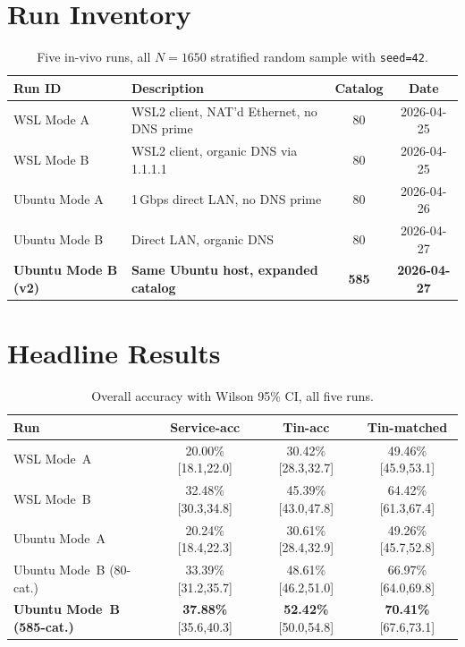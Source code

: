 \documentclass[11pt,a4paper]{article}
\begin{document}
\section{Run Inventory}

\begin{table}[h]
\centering
\caption{Five in-vivo runs, all $N=1650$ stratified random sample with
\texttt{seed=42}.}
\begin{tabularx}{\textwidth}{lXcc}
\toprule
\textbf{Run ID} & \textbf{Description} & \textbf{Catalog} & \textbf{Date} \\
\midrule
WSL Mode A     & WSL2 client, NAT'd Ethernet, no DNS prime           & 80    & 2026-04-25 \\
WSL Mode B     & WSL2 client, organic DNS via 1.1.1.1                & 80    & 2026-04-25 \\
Ubuntu Mode A  & 1\,Gbps direct LAN, no DNS prime                    & 80    & 2026-04-26 \\
Ubuntu Mode B  & Direct LAN, organic DNS                             & 80    & 2026-04-27 \\
\textbf{Ubuntu Mode B (v2)} & \textbf{Same Ubuntu host, expanded catalog}    & \textbf{585}   & \textbf{2026-04-27} \\
\bottomrule
\end{tabularx}
\end{table}

\section{Headline Results}

\begin{table}[h]
\centering
\caption{Overall accuracy with Wilson 95\% CI, all five runs.}
\label{tab:overall}
\begin{tabular}{l|ccc}
\toprule
\textbf{Run} & \textbf{Service-acc} & \textbf{Tin-acc} & \textbf{Tin-matched} \\
\midrule
WSL    Mode~A           & 20.00\% [18.1,22.0] & 30.42\% [28.3,32.7] & 49.46\% [45.9,53.1] \\
WSL    Mode~B           & 32.48\% [30.3,34.8] & 45.39\% [43.0,47.8] & 64.42\% [61.3,67.4] \\
Ubuntu Mode~A           & 20.24\% [18.4,22.3] & 30.61\% [28.4,32.9] & 49.26\% [45.7,52.8] \\
Ubuntu Mode~B (80-cat.) & 33.39\% [31.2,35.7] & 48.61\% [46.2,51.0] & 66.97\% [64.0,69.8] \\
\rowcolor{blue!8} \textbf{Ubuntu Mode~B (585-cat.)} & \textbf{37.88\%} [35.6,40.3] & \textbf{52.42\%} [50.0,54.8] & \textbf{70.41\%} [67.6,73.1] \\
\bottomrule
\end{tabular}
\end{table}
\end{document}
